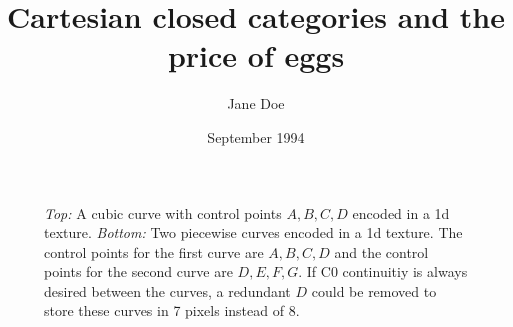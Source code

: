 \documentclass{article}
\title{Cartesian closed categories and the price of eggs}
\author{Jane Doe}
\date{September 1994}
\begin{document}
	\begin{figure}

		\vspace{5mm}

		\caption{\textit{Top:} A cubic curve with control points $A,B,C,D$ encoded in a 1d texture.  \textit{Bottom:} Two piecewise curves encoded in a 1d texture.  The control points for the first curve are $A,B,C,D$ and the control points for the second curve are $D,E,F,G$.  If C0 continuitiy is always desired between the curves, a redundant $D$ could be removed to store these curves in 7 pixels instead of 8.}		
		\label{fig:texlayeout1d}
	\end{figure}	
\end{document}
